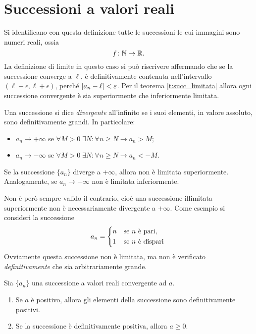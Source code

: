 \section{Successioni a valori reali}
Si identificano con questa definizione tutte le successioni le cui immagini sono numeri reali, ossia
\[
f\colon\mathbb{N}\to\mathbb{R}.
\]
La definizione di limite in questo caso si può riscrivere affermando che se la successione converge a $\ell$, è definitivamente contenuta nell'intervallo $(\ell-\epsilon,\ell+\epsilon)$, perché $\lvert a_n-\ell\rvert<\varepsilon$.
Per il teorema \ref{t:succ_limitata} allora ogni successione convergente è sia superiormente che inferiormente limitata.

\begin{definizione}
Una successione si dice \emph{divergente} all'infinito se i suoi elementi, in valore assoluto, sono definitivamente grandi. In particolare:
\begin{itemize}
\item $a_n\to +\infty$ se $\forall M>0\;\exists N\colon\forall n\geq N\to a_n>M$;
\item $a_n\to -\infty$ se $\forall M>0\;\exists N\colon\forall n\geq N\to a_n<-M$.
\end{itemize}
\end{definizione}
\begin{teorema}
Se la successione $\{a_n\}$ diverge a $+\infty$, allora non è limitata superiormente. Analogamente, se $a_n\to -\infty$ non è limitata inferiormente.
\end{teorema}
Non è però sempre valido il contrario, cioè una successione illimitata superiormente non è necessariamente divergente a $+\infty$. Come esempio si consideri la successione
\[
a_n=
\begin{cases*}
	n & se $n$ è pari,\\
	1 & se $n$ è dispari
\end{cases*}
\]
Ovviamente questa successione non è limitata, ma non è verificato \emph{definitivamente} che sia arbitrariamente grande.
\begin{teorema}
\label{t:permanenza_segno}
Sia $\{a_n\}$ una successione a valori reali convergente ad $a$.
\begin{enumerate}
\item Se $a$ è positivo, allora gli elementi della successione sono definitivamente positivi.
\item Se la successione è definitivamente positiva, allora $a\geq 0$.
\end{enumerate}
\end{teorema}
